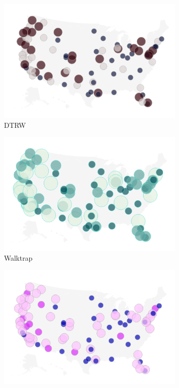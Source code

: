 \documentclass[12pt,a4paper]{article}
\begin{document}
\begin{figure}[H]
  \centering
  \begin{subfigure}[b]{0.4\textwidth}
    \centering
    \includegraphics[width=\textwidth]{flight_net/map_DTRW_t10.png}
    \caption{DTRW}
    \label{fig:map_DTRW}
  \end{subfigure}
  \hfill
  \begin{subfigure}[b]{0.4\textwidth}
    \centering
    \includegraphics[width=\textwidth]{flight_net/map_wt_t10.png}
    \caption{Walktrap}
    \label{fig:map_wt}
  \end{subfigure}
  \hfill
  \begin{subfigure}[b]{0.4\textwidth}
    \centering
    \includegraphics[width=\textwidth]{flight_net/map_dynsim_t10.png}

\end{subfigure}
\end{figure}
\end{document}
